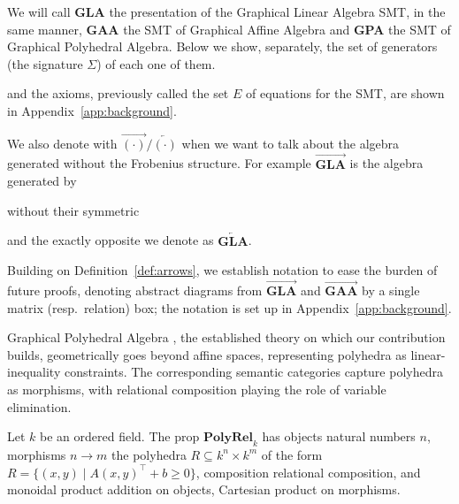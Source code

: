 \begin{definition}
	We will call $\textbf{GLA}$ the presentation of the Graphical Linear Algebra SMT, in the same manner, $\textbf{GAA}$ the SMT of Graphical Affine Algebra and \textbf{GPA} the SMT of Graphical Polyhedral Algebra. Below we show, separately, the set of generators (the signature $\Sigma$) of each one of them.

    

	and the axioms, previously called the set $E$ of equations for the SMT,
	are shown in Appendix~\ref{app:background}.
\end{definition}

\begin{definition}\label{def:arrows}
	We also denote with $\overrightarrow{(\cdot)}/\overleftarrow{(\cdot)}$ when we want to talk about the algebra generated without the Frobenius structure. For example $\overrightarrow{\textbf{GLA}}$ is the algebra generated by
	\begin{figure}[H]
		\centering
        
	\end{figure}
	without their symmetric
	\begin{figure}[H]
		\centering
        
	\end{figure}
	and the exactly opposite we denote as $\overleftarrow{\textbf{GLA}}$.
\end{definition}


Building on Definition~\ref{def:arrows}, we establish notation to ease the
burden of future proofs, denoting abstract diagrams from
$\overrightarrow{\textbf{GLA}}$ and $\overrightarrow{\textbf{GAA}}$ by a
single matrix (resp.\ relation) box; the notation is set up in
Appendix~\ref{app:background}.


Graphical Polyhedral Algebra \cite{bonchi2021polyhedral,bonchi2021.9farkas}, the established theory on which our contribution builds, geometrically goes beyond affine spaces, representing polyhedra as linear-inequality constraints. The corresponding semantic categories capture polyhedra as morphisms, with relational composition playing the role of variable elimination.

\begin{definition}
	Let $k$ be an ordered field. The prop $\mathbf{PolyRel}_k$ has objects natural numbers $n$, morphisms $n\to m$ the polyhedra $R \subseteq k^n \times k^m$ of the form
	$R = \{ (x,y) \mid A (x,y)^\top + b \ge 0 \}$,
	composition relational composition, and monoidal product addition on objects, Cartesian product on morphisms.
\end{definition}

